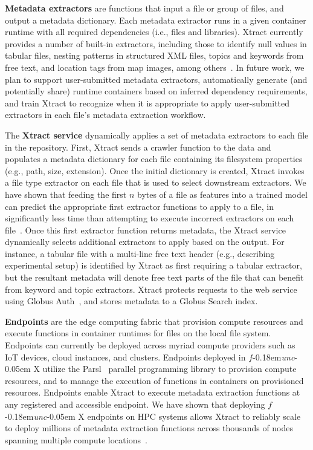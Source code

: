 \documentclass[sigconf, 9pt]{acmart}
\newcommand{\name}{Xtract}
\newcommand{\funcx}{$f$\kern-0.18em\emph{unc}\kern-0.05em X}
\begin{document}
\textbf{Metadata extractors} are functions that input a file or group of files, and output a metadata dictionary. 
Each metadata extractor runs in a given container runtime with all required dependencies (i.e., files and 
libraries).  \name{} currently provides a number of built-in extractors, including
those to identify null values in tabular files, nesting patterns in structured XML files, topics and keywords from free text, and location tags from map images, 
among others~\cite{skluzacek2019serverless}. In future work, 
we plan to support user-submitted metadata extractors, automatically generate (and potentially share) runtime containers based on inferred 
dependency requirements, and train \name{} to recognize when it is appropriate to apply user-submitted extractors in each file's metadata extraction workflow. 

The \textbf{\name{} service} dynamically applies a set of metadata extractors to each file in the repository. 
First, \name{} sends a crawler function to the data and populates a metadata dictionary for each file containing
its filesystem properties (e.g., path, size, extension).  Once the initial dictionary is created, \name{} invokes a file type extractor on each 
file that is used to select downstream extractors. We have shown that feeding 
the first $n$ bytes of a file as features into 
a trained model can predict the appropriate first extractor functions to apply to a file, in significantly less time
than attempting to execute incorrect extractors on each file~\cite{skluzacek2018skluma}. Once this first extractor function returns metadata, the \name{} service dynamically selects additional extractors to apply based on the output.  For instance, 
a tabular file with a multi-line free text header (e.g., describing experimental setup) is identified by \name{} as first requiring a tabular extractor, but 
the resultant metadata will denote free text parts of the file that can benefit from keyword and topic extractors.
\name{} protects requests to the web service using Globus Auth~\cite{tuecke2016globus}, and stores metadata to a Globus Search index. 

\textbf{Endpoints} are the edge computing fabric that provision compute resources and execute functions in container runtimes for files on the local file system.
 Endpoints can currently be deployed across myriad compute providers such as IoT devices, cloud instances, and clusters.  
Endpoints deployed in \funcx{} utilize the Parsl~\cite{babuji2019parsl} parallel programming library to 
provision compute resources, and to manage the execution of functions in containers on provisioned resources. Endpoints enable 
\name{} to execute metadata extraction functions at any registered and accessible endpoint. 
We have shown that deploying \funcx{} 
endpoints on HPC systems allows \name{} to reliably
scale to deploy millions of metadata extraction functions 
across thousands of nodes spanning multiple compute locations~\cite{chard2019serverless}. 
\end{document}
